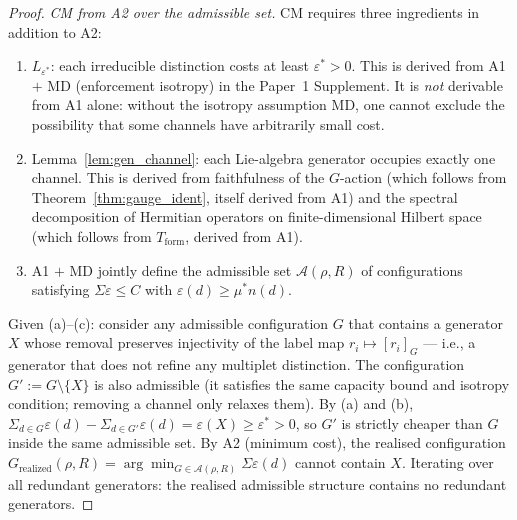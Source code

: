 \documentclass[11pt,a4paper]{article}
\theoremstyle{definition}
\begin{document}
\begin{proof}
\textit{CM from A2 over the admissible set.}\quad
CM requires three ingredients in addition to A2:
\begin{enumerate}[label=(\alph*),nosep]
  \item $L_{\varepsilon^*}$: each irreducible distinction costs at
  least $\varepsilon^* > 0$.  This is derived from A1 $+$ MD
  (enforcement isotropy) in the Paper~1 Supplement.  It is
  \emph{not} derivable from A1 alone: without the isotropy assumption
  MD, one cannot exclude the possibility that some channels have
  arbitrarily small cost.
  \item Lemma~\ref{lem:gen_channel}: each Lie-algebra generator
  occupies exactly one channel.  This is derived from faithfulness of
  the $G$-action (which follows from Theorem~\ref{thm:gauge_ident},
  itself derived from A1) and the spectral decomposition of Hermitian
  operators on finite-dimensional Hilbert space (which follows from
  $T_{\mathrm{form}}$, derived from A1).
  \item A1 $+$ MD jointly define the admissible set
  $\mathcal{A}(\rho, R)$ of configurations satisfying
  $\Sigma\varepsilon \le C$ with $\varepsilon(d) \ge \mu^* n(d)$.
\end{enumerate}
Given (a)--(c): consider any admissible configuration $G$ that
contains a generator $X$ whose removal preserves injectivity of the
label map $r_i \mapsto [r_i]_G$ --- i.e., a generator that does not
refine any multiplet distinction.  The configuration $G' := G
\setminus \{X\}$ is also admissible (it satisfies the same capacity
bound and isotropy condition; removing a channel only relaxes them).
By (a) and (b), $\Sigma_{d \in G} \varepsilon(d) - \Sigma_{d \in G'}
\varepsilon(d) = \varepsilon(X) \ge \varepsilon^* > 0$, so $G'$ is
strictly cheaper than $G$ inside the same admissible set.  By A2
(minimum cost), the realised configuration $G_{\mathrm{realized}}(\rho, R)
= \arg\min_{G \in \mathcal{A}(\rho, R)} \Sigma\varepsilon(d)$ cannot
contain $X$.  Iterating over all redundant generators: the realised
admissible structure contains no redundant generators.
\end{proof}
\end{document}
